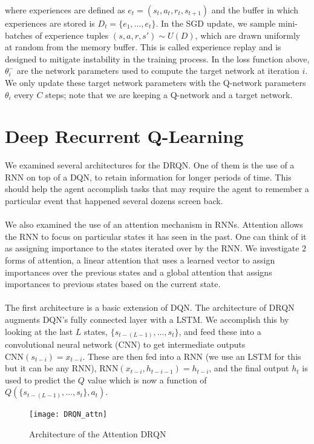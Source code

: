 \documentclass{article}
\begin{document}
where experiences are defined as $e_t = (s_t, a_t, r_t, s_{t+1})$ and the buffer
in which experiences are stored is $D_t = \{e_1, \dots, e_t\}$. In the SGD update,
we sample mini-batches of experience tuples $(s, a, r, s') \sim U(D)$, which are
drawn uniformly at random from the memory buffer. This is called experience replay
and is designed to mitigate instability in the training process. In the loss
function above, $\theta_i^-$ are the network parameters used to compute the target
network at iteration $i$. We only update these target network parameters with
the Q-network parameters $\theta_i$ every $C$ steps; note that we are keeping a
Q-network and a target network.

\section{Deep Recurrent Q-Learning}

We examined several architectures for the DRQN. One of them is the use of a RNN on top
of a DQN, to retain information for longer periods of time. This should help the
agent accomplish tasks that may require the agent to remember a particular event
that happened several dozens screen back. \\
\\
We also examined the use of an attention
mechanism in RNNs. Attention allows the RNN to focus on particular states it
has seen in the past. One can think of it as assigning importance to the states
iterated over by the RNN. We investigate $2$ forms of attention, a linear attention
that uses a learned vector to assign importances over the previous states and a
global attention that assigns importances to previous states based on the current
state. \\
\\
The first architecture is a basic extension of DQN. The architecture of DRQN
augments DQN's fully connected layer with a LSTM. We accomplish this by looking at
the last $L$ states, $\{s_{t-(L-1)}, \dots, s_{t}\}$, and feed these into a
convolutional neural network (CNN) to get intermediate outputs
$\text{CNN}(s_{t-i}) = x_{t-i}$. These are then fed into a RNN (we use an LSTM for
this but it can be any RNN), $\text{RNN}(x_{t-i}, h_{t-i-1}) = h_{t-i}$, and the
final output $h_t$ is used to predict the $Q$ value which is now a function of
$Q(\{s_{t-(L-1)}, \dots, s_t\}, a_t)$.

\begin{figure}[h]
    \centering
    \texttt{[image: DRQN\_attn]}
    \caption{Architecture of the Attention DRQN}
\end{figure}
\end{document}
